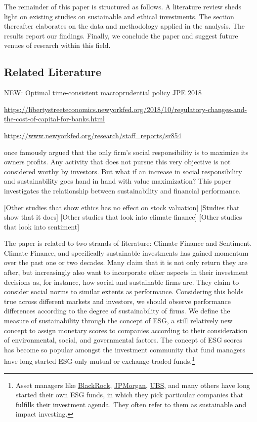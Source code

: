 \documentclass[11pt]{article}
\begin{document}
The remainder of this paper is structured as follows. A literature review sheds light on existing studies on sustainable and ethical investments. The section thereafter elaborates on the data and methodology applied in the analysis. The results report our findings. Finally, we conclude the paper and suggest future venues of research within this field.


\subsection*{Related Literature}

NEW: Optimal time-consistent macroprudential policy JPE 2018

\url{https://libertystreeteconomics.newyorkfed.org/2018/10/regulatory-changes-and-the-cost-of-capital-for-banks.html}

\url{https://www.newyorkfed.org/research/staff_reports/sr854}


\cite{MiltonFriedman1970} once famously argued that the only firm’s social responsibility is to maximize its owners profits. Any activity that does not pursue this very objective is not considered worthy by investors. But what if an increase in social responsibility and sustainability goes hand in hand with value maximization? This paper investigates the relationship between sustainability and financial performance. 

[Other studies that show ethics has no effect on stock valuation] [Studies that show that it does] [Other studies that look into climate finance] [Other studies that look into sentiment]

The paper is related to two strands of literature: Climate Finance and Sentiment. Climate Finance, and specifically sustainable investments has gained momentum over the past one or two decades. Many claim that it is not only return they are after, but increasingly also want to incorporate other aspects in their investment decisions as, for instance, how social and sustainable firms are. They claim to consider social norms to similar extents as performance. Considering this holds true across different markets and investors, we should observe performance differences according to the degree of sustainability of firms. We define the measure of sustainability through the concept of ESG, a still relatively new concept to assign monetary scores to companies according to their consideration of environmental, social, and governmental factors. The concept of ESG scores has become so popular amongst the investment community that fund managers have long started ESG-only mutual or exchange-traded funds.\footnote{Asset managers like \href{https://www.ishares.com/uk/individual/en/themes/sustainable-investing?switchLocale=y&siteEntryPassthrough=true}{BlackRock}, \href{https://www.jpmorgan.com/country/DK/en/detail/1320566638713}{JPMorgan}, \href{https://www.ubs.com/global/en/asset-management/investment-capabilities/sustainability.html}{UBS}, and many others have long started their own ESG funds, in which they pick particular companies that fulfills their investment agenda. They often refer to them as sustainable and impact investing.} 
\end{document}
